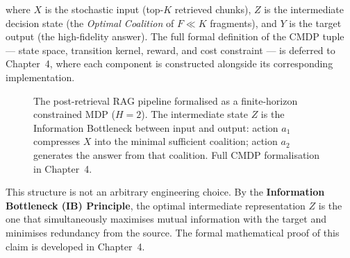 where $X$ is the stochastic input (top-$K$ retrieved chunks), $Z$ is the intermediate decision state (the \emph{Optimal Coalition} of $F \ll K$ fragments), and $Y$ is the target output (the high-fidelity answer). The full formal definition of the CMDP tuple — state space, transition kernel, reward, and cost constraint — is deferred to Chapter~4, where each component is constructed alongside its corresponding implementation.


\begin{figure}[H]
    \centering
    \caption{The post-retrieval RAG pipeline formalised as a finite-horizon constrained MDP ($H=2$). The intermediate state $Z$ is the Information Bottleneck between input and output: action $a_1$ compresses $X$ into the minimal sufficient coalition; action $a_2$ generates the answer from that coalition. Full CMDP formalisation in Chapter~4.}
    \label{fig:markov_chain}
\end{figure}


This structure is not an arbitrary engineering choice. By the \textbf{Information Bottleneck (IB) Principle}\cite{IT, ITBottleneck}, the optimal intermediate representation $Z$ is the one that simultaneously maximises mutual information with the target and minimises redundancy from the source. The formal mathematical proof of this claim is developed in Chapter~4.
